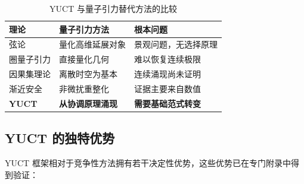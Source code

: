\documentclass[11pt,a4paper]{article}
\theoremstyle{remark}
\begin{document}
	\begin{table}[htbp]
		\centering
		\begin{tabular}{lp{4cm}p{4cm}}
			\toprule
			\textbf{理论} & \textbf{量子引力方法} & \textbf{根本问题} \\
			\midrule
			弦论 & 量化高维延展对象 & 景观问题，无选择原理 \\
			圈量子引力 & 直接量化几何 & 难以恢复连续极限 \\
			因果集理论 & 离散时空为基本 & 连续涌现尚未证明 \\
			渐近安全 & 非微扰重整化 & 证据主要来自数值 \\
			\midrule
			\textbf{YUCT} & \textbf{从协调原理涌现} & \textbf{需要基础范式转变} \\
			\bottomrule
		\end{tabular}
		\caption{YUCT 与量子引力替代方法的比较}
		\label{tab:comparison}
	\end{table}
	
	\subsection{YUCT 的独特优势}
	
	YUCT 框架相对于竞争性方法拥有若干决定性优势，这些优势已在专门附录中得到验证：
	
\end{document}
